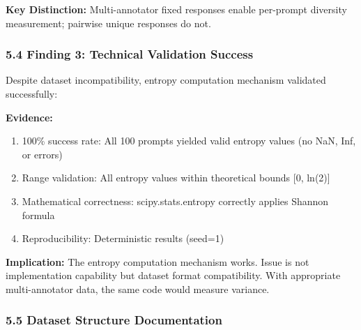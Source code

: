 \textbf{Key Distinction:} Multi-annotator fixed responses enable per-prompt diversity measurement; pairwise unique responses do not.

\subsubsection{5.4 Finding 3: Technical Validation Success}

Despite dataset incompatibility, entropy computation mechanism validated successfully:

\textbf{Evidence:}
\begin{enumerate}
\item 100\% success rate: All 100 prompts yielded valid entropy values (no NaN, Inf, or errors)
\item Range validation: All entropy values within theoretical bounds [0, ln(2)]
\item Mathematical correctness: scipy.stats.entropy correctly applies Shannon formula
\item Reproducibility: Deterministic results (seed=1)
\end{enumerate}

\textbf{Implication:} The entropy computation mechanism works. Issue is not implementation capability but dataset format compatibility. With appropriate multi-annotator data, the same code would measure variance.

\subsubsection{5.5 Dataset Structure Documentation}

\begin{table}[htbp]
\centering
{}
\end{table}

